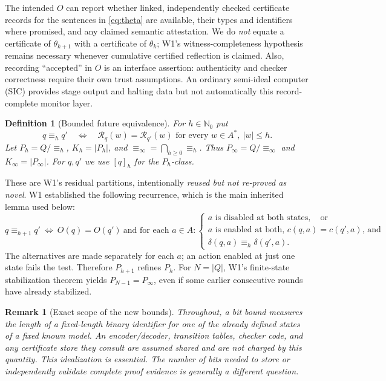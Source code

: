 \documentclass[11pt,letterpaper]{article}
\newtheorem{definition}[theorem]{Definition}
\newtheorem{remark}[theorem]{Remark}
\newcommand{\Nzero}{\mathbb{N}_0}
\newcommand{\R}{\mathcal{R}}
\newcommand{\eqk}[1]{\equiv_{#1}}
\newcommand{\eqinf}{\equiv_{\infty}}
\begin{document}
The intended $O$ can report whether linked, independently checked certificate records for the sentences in \eqref{eq:theta} are available, their types and identifiers where promised, and any claimed semantic attestation. We do \emph{not} equate a certificate of $\theta_{k+1}$ with a certificate of $\theta_k$; W1's witness-completeness hypothesis remains necessary whenever cumulative certified reflection is claimed. Also, recording ``accepted'' in $O$ is an interface assertion: authenticity and checker correctness require their own trust assumptions. An ordinary semi-ideal computer (SIC) provides stage output and halting data but not automatically this record-complete monitor layer.

\begin{definition}[Bounded future equivalence]\label{def:bounded}
For $h\in\Nzero$ put
\[
q\eqk{h}q'\quad\Longleftrightarrow\quad \R_q(w)=\R_{q'}(w)\text{ for every }w\in A^*,\ |w|\le h.
\]
Let $P_h=Q/\eqk{h}$, $K_h=|P_h|$, and $\eqinf=\bigcap_{h\ge0}\eqk{h}$. Thus $P_\infty=Q/\eqinf$ and $K_\infty=|P_\infty|$. For $q,q'$ we use $[q]_h$ for the $P_h$-class.
\end{definition}

These are W1's residual partitions, intentionally \emph{reused but not re-proved as novel}. W1 established the following recurrence, which is the main inherited lemma used below:
\begin{equation}\label{eq:rec}
q\eqk{h+1}q'\ \Longleftrightarrow\ O(q)=O(q')\ \text{and for each }a\in A:
\begin{cases}
\text{$a$ is disabled at both states},\quad\text{or}\\
\text{$a$ is enabled at both, $c(q,a)=c(q',a)$, and }\\
\delta(q,a)\eqk{h}\delta(q',a).
\end{cases}
\end{equation}
The alternatives are made separately for each $a$; an action enabled at just one state fails the test. Therefore $P_{h+1}$ refines $P_h$. For $N=|Q|$, W1's finite-state stabilization theorem yields $P_{N-1}=P_\infty$, even if some earlier consecutive rounds have already stabilized.

\begin{remark}[Exact scope of the new bounds]\label{rem:scope}
Throughout, a \emph{bit bound} measures the length of a fixed-length binary identifier for one of the \emph{already defined states of a fixed known model}. An encoder/decoder, transition tables, checker code, and any certificate store they consult are assumed shared and are \emph{not charged} by this quantity. This idealization is essential. The number of bits needed to store or independently validate complete proof evidence is generally a different question.
\end{remark}
\end{document}
